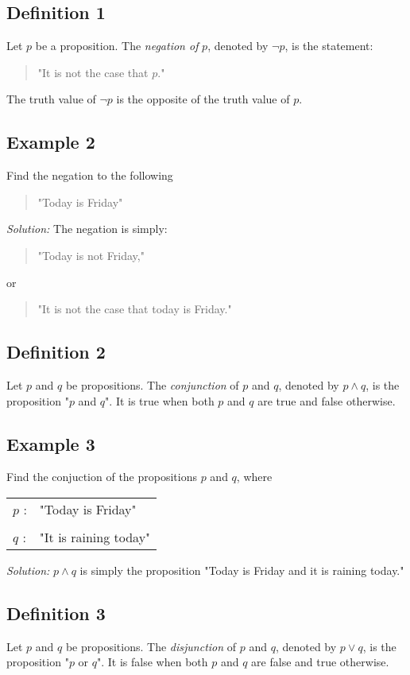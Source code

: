 \documentclass{article}
\begin{document}
\subsection[Negation of a proposition]{Definition 1}
Let $p$ be a proposition. The \textit{negation of} $p$,
denoted by $\neg{p}$, is the statement:
\begin{quote}
	"It is not the case that $p$."
\end{quote}
The truth value of $\neg{p}$ is the opposite of the truth value of $p$.

\subsection*{Example 2}
Find the negation to the following
\begin{quote}
	"Today is Friday"
\end{quote}
\textit{Solution:} The negation is simply:
\begin{quote}
	"Today is not Friday,"
\end{quote}
or
\begin{quote}
	"It is not the case that today is Friday."
\end{quote}
\subsection[Conjunction of propositions]{Definition 2}
Let $p$ and $q$ be propositions. The \textit{conjunction} of $p$ and $q$,
denoted by $p \wedge q$, is the proposition "$p$ and $q$".
It is true when both $p$ and $q$ are true and false otherwise.
\subsection*{Example 3}
Find the conjuction of the propositions $p$ and $q$, where

\begin{center}
	\begin{tabular}{ll}
		$p$ : & "Today is Friday"     \\
		      &                       \\
		$q$ : & "It is raining today" \\
	\end{tabular}
\end{center}
\textit{Solution:} $p \wedge q$ is simply the proposition
"Today is Friday and it is raining today."
\subsection[Disjunction of propositions]{Definition 3}
Let $p$ and $q$ be propositions. The \textit{disjunction} of $p$ and $q$,
denoted by $p \vee q$, is the proposition "$p$ or $q$".
It is false when both $p$ and $q$ are false and true otherwise.
\end{document}
